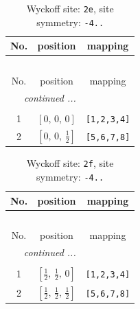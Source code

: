 \documentclass[fleqn,8pt]{jsarticle}
\begin{document}
\begin{longtable}{ccc}
\caption{Wyckoff site: {\tt 2e}, site symmetry: {\tt -4..}}
 \\
 \hline \hline
No. & position & mapping \\ \hline \endfirsthead

\multicolumn{2}{l}{\tablename\ \thetable{}} \\
 \hline \hline
No. & position & mapping \\ \hline \endhead

 \hline \hline
\multicolumn{2}{r}{\footnotesize\it continued ...} \\ \endfoot

 \hline \hline
\multicolumn{2}{r}{} \\ \endlastfoot

1 & $\left[ 0,\, 0,\, 0 \right]$ & {\tt [1,2,3,4]} \\ \hline
2 & $\left[ 0,\, 0,\, \frac{1}{2} \right]$ & {\tt [5,6,7,8]} \\
\end{longtable}
\renewcommand{\arraystretch}{1.2}
\begin{longtable}{ccc}
\caption{Wyckoff site: {\tt 2f}, site symmetry: {\tt -4..}}
 \\
 \hline \hline
No. & position & mapping \\ \hline \endfirsthead

\multicolumn{2}{l}{\tablename\ \thetable{}} \\
 \hline \hline
No. & position & mapping \\ \hline \endhead

 \hline \hline
\multicolumn{2}{r}{\footnotesize\it continued ...} \\ \endfoot

 \hline \hline
\multicolumn{2}{r}{} \\ \endlastfoot

1 & $\left[ \frac{1}{2},\, \frac{1}{2},\, 0 \right]$ & {\tt [1,2,3,4]} \\ \hline
2 & $\left[ \frac{1}{2},\, \frac{1}{2},\, \frac{1}{2} \right]$ & {\tt [5,6,7,8]} \\
\end{longtable}
\renewcommand{\arraystretch}{1.2}
\end{document}
